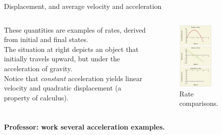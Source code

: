 \documentclass{beamer}
\begin{document}
\begin{frame}{Displacement, and average velocity and acceleration}
\begin{columns}[T]
\begin{column}{0.5\textwidth}
\small
These quantities are examples of rates, derived from initial and final states. \\
\vspace{1cm}
The situation at right depicts an object that initially travels upward, but under the acceleration of gravity. \\
\vspace{1 cm}
Notice that \textit{constant} acceleration yields linear velocity and quadratic displacement (a property of calculus).
\end{column}
\begin{column}{0.5\textwidth}
\begin{figure}
\centering
\includegraphics[width=0.6\textwidth]{figures/slope2.png}
\caption{\label{fig:slope2} Rate comparisons.}
\end{figure}
\end{column}
\end{columns}
\textbf{Professor: work several acceleration examples.}
\end{frame}
\end{document}
